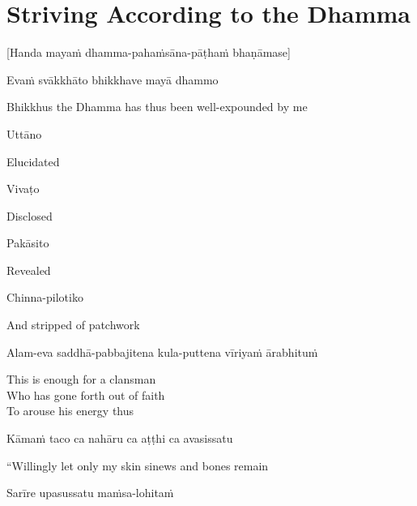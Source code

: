 \suttaRef{[AN 6.22 \& 8.79]}


\section{Striving According to the Dhamma}
\label{striving-according-to-dhamma}

\begin{center}
  [Handa mayaṁ dhamma-pahaṁsāna-pāṭhaṁ bhaṇāmase]
\end{center}

Evaṁ svākkhāto bhikkhave mayā dhammo

\begin{english}
  Bhikkhus the Dhamma has thus been well-expounded by me
\end{english}

Uttāno

\begin{english}
  Elucidated
\end{english}

Vivaṭo

\begin{english}
  Disclosed
\end{english}

Pakāsito

\begin{english}
  Revealed
\end{english}

Chinna-pilotiko

\begin{english}
  And stripped of patchwork
\end{english}

Alam-eva saddhā-pabbajitena kula-puttena vīriyaṁ ārabhituṁ

\begin{english}
  This is enough for a clansman\\
  Who has gone forth out of faith\\
  To arouse his energy thus
\end{english}

Kāmaṁ taco ca nahāru ca aṭṭhi ca avasissatu

\begin{english}
  “Willingly let only my skin  sinews  and bones remain
\end{english}

Sarīre upasussatu maṁsa-lohitaṁ

